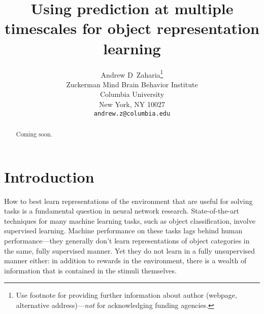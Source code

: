 \documentclass{article}
\title{Using prediction at multiple timescales for object representation learning}
\author{%
  Andrew D~Zaharia\thanks{Use footnote for providing further information
    about author (webpage, alternative address)---\emph{not} for acknowledging
    funding agencies.} \\
  Zuckerman Mind Brain Behavior Institute\\
  Columbia University\\
  New York, NY 10027 \\
  \texttt{andrew.z@columbia.edu} \\
}
\begin{document}

\maketitle

\begin{abstract}
  Coming soon.
\end{abstract}


\section{Introduction}

How to best learn representations of the environment that are useful for solving tasks is a fundamental question in neural network research. State-of-the-art techniques for many machine learning tasks, such as object classification, involve supervised learning. Machine performance on these tasks lags behind human performance---they generally don't learn representations of object categories in the same, fully supervised manner. Yet they do not learn in a fully unsupervised manner either: in addition to rewards in the environment, there is a wealth of information that is contained in the stimuli themselves.
\end{document}
